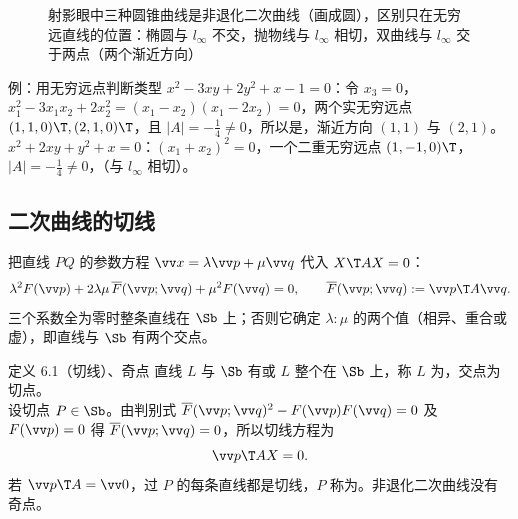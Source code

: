 \begin{figure}[htbp]
\centering
{}
\caption{射影眼中三种圆锥曲线是非退化二次曲线（画成圆），区别只在无穷远直线的位置：椭圆与 $l_\infty$ 不交，抛物线与 $l_\infty$ 相切，双曲线与 $l_\infty$ 交于两点（两个渐近方向）}
\end{figure}

\begin{mtbox}{例：用无穷远点判断类型}
$x^2-3xy+2y^2+x-1=0$：令 $x_3=0$，$x_1^2-3x_1x_2+2x_2^2=(x_1-x_2)(x_1-2x_2)=0$，两个实无穷远点 $(1,1,0)\T,(2,1,0)\T$，且 $|A|=-\frac14\neq0$，所以是，渐近方向 $(1,1)$ 与 $(2,1)$。\\
$x^2+2xy+y^2+x=0$：$(x_1+x_2)^2=0$，一个二重无穷远点 $(1,-1,0)\T$，$|A|=-\frac14\neq0$，（与 $l_\infty$ 相切）。
\end{mtbox}

\subsection{二次曲线的切线}
把直线 $PQ$ 的参数方程 $\vv x=\lambda\vv p+\mu\vv q$ 代入 $X\T AX=0$：
\begin{equation}
\lambda^2F(\vv p)+2\lambda\mu\,\overline F(\vv p;\vv q)+\mu^2F(\vv q)=0,\qquad \overline F(\vv p;\vv q):=\vv p\T A\vv q .
\end{equation}
三个系数全为零时整条直线在 $\Sb$ 上；否则它确定 $\lambda:\mu$ 的两个值（相异、重合或虚），即直线与 $\Sb$ 有两个交点。

\begin{defbox}{定义 6.1（切线）、奇点}
直线 $L$ 与 $\Sb$ 有或 $L$ 整个在 $\Sb$ 上，称 $L$ 为，交点为切点。\\
设切点 $P\in\Sb$。由判别式 $\overline F(\vv p;\vv q)^2-F(\vv p)F(\vv q)=0$ 及 $F(\vv p)=0$ 得 $\overline F(\vv p;\vv q)=0$，所以切线方程为
\begin{equation}
\vv p\T AX=0 .
\end{equation}
若 $\vv p\T A=\vv0$，过 $P$ 的每条直线都是切线，$P$ 称为。非退化二次曲线没有奇点。
\end{defbox}

